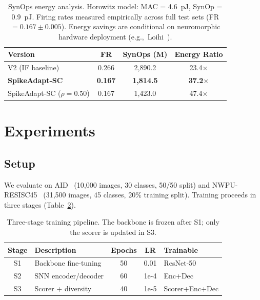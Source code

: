 \documentclass[conference]{IEEEtran}
\begin{document}
\begin{table}[t]
\renewcommand{\arraystretch}{1.12}
\centering
\caption{SynOps energy analysis. Horowitz model: MAC = 4.6~pJ, SynOp = 0.9~pJ. Firing rates measured empirically across full test sets (FR$=0.167\pm0.005$). Energy savings are conditional on neuromorphic hardware deployment (e.g.,\ Loihi~\cite{davies2018loihi}).}
\label{tab:synops}
\begin{tabular}{l ccc}
\toprule
\textbf{Version} & \textbf{FR} & \textbf{SynOps (M)} & \textbf{Energy Ratio} \\
\midrule
V2 (IF baseline) & 0.266 & 2,890.2 & 23.4$\times$ \\
\textbf{SpikeAdapt-SC} & \textbf{0.167} & \textbf{1,814.5} & \textbf{37.2}$\times$ \\
SpikeAdapt-SC ($\rho{=}0.50$) & 0.167 & 1,423.0 & 47.4$\times$ \\
\bottomrule
\end{tabular}
\end{table}

\section{Experiments}
\label{sec:eval}

\subsection{Setup}

We evaluate on AID~\cite{xia2017aid} (10,000 images, 30 classes, 50/50 split) and NWPU-RESISC45~\cite{cheng2017resisc} (31,500 images, 45 classes, 20\% training split). Training proceeds in three stages (Table~\ref{tab:training}).

\begin{table}[t]
\renewcommand{\arraystretch}{1.12}
\centering
\caption{Three-stage training pipeline. The backbone is frozen after S1; only the scorer is updated in S3.}
\label{tab:training}
\setlength{\tabcolsep}{4pt}
\begin{tabular}{c l c c l}
\toprule
\textbf{Stage} & \textbf{Description} & \textbf{Epochs} & \textbf{LR} & \textbf{Trainable} \\
\midrule
S1 & Backbone fine-tuning & 50 & 0.01 & ResNet-50 \\
S2 & SNN encoder/decoder & 60 & 1e-4 & Enc+Dec \\
S3 & Scorer + diversity & 40 & 1e-5 & Scorer+Enc+Dec \\
\bottomrule
\end{tabular}
\end{table}
\end{document}
